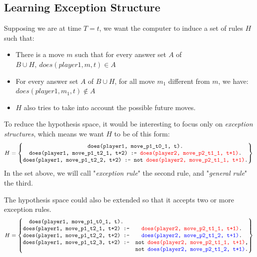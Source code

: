\documentclass[12pt,twoside]{report}
\begin{document}
\subsection{Learning Exception Structure}

Supposing we are at time $T=t$, we want the computer to induce a set of rules $H$ such that:
\begin{itemize}
\item There is a move $m$ such that for every answer set $A$ of $B\cup H,\:  does(player1, m, t)\in A$
\item For every answer set $A$ of $B\cup H$, for all move $m_1$ different from $m$, we have: $does(player1, m_1, t) \notin A$
\item $H$ also tries to take into account the possible future moves.
\end{itemize}

To reduce the hypothesis space, it would be interesting to focus only on \textit{exception structures}, which means we want $H$ to be of this form:
\[H=
\begin{Bmatrix}
\texttt{does(player1, move\_p1\_t0\_1, t).}\\
\texttt{does(player1, move\_p1\_t2\_1, t+2) :- \textcolor{red}{does(player2, move\_p2\_t1\_1, t+1)}.}\\
\texttt{does(player1, move\_p1\_t2\_2, t+2) :- not \textcolor{red}{does(player2, move\_p2\_t1\_1, t+1)}.} 
\end{Bmatrix}
\]
In the set above, we will call "\textit{exception rule}" the second rule, and "\textit{general rule}" the third.

\begin{remark}
 The hypothesis space could also be extended so that it accepts two or more  exception rules.
\[H=
\begin{Bmatrix}
\texttt{does(player1, move\_p1\_t0\_1, t).}\\
\texttt{does(player1, move\_p1\_t2\_1, t+2) :-} &\texttt{\textcolor{red}{does(player2, move\_p2\_t1\_1, t+1)}.}\\
\texttt{does(player1, move\_p1\_t2\_2, t+2) :-} &\texttt{\textcolor{blue}{does(player2, move\_p2\_t1\_2, t+1)}.}\\
\texttt{does(player1, move\_p1\_t2\_3, t+2) :-} &\texttt{not \textcolor{red}{does(player2, move\_p2\_t1\_1, t+1)},}\\ &\texttt{not \textcolor{blue}{does(player2, move\_p2\_t1\_2, t+1)}.} 
\end{Bmatrix}
\]
\end{remark}
\end{document}
